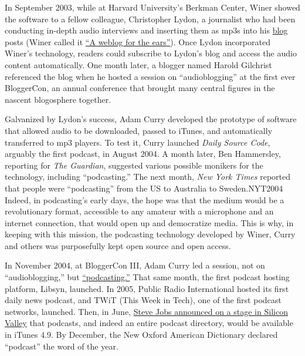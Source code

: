 \documentclass[notoc, symmetric, nobib, nols]{towcenter-guideto-book}
\begin{document}
In September 2003, while at Harvard University’s Berkman Center, Winer showed the software to a fellow colleague, Christopher Lydon, a journalist who had been conducting in-depth audio interviews and inserting them as mp3s into his \href{http://blogs.harvard.edu/lydondev/}{blog} posts (Winer called it \href{http://scripting.com/davenet/2003/07/31/chrisLydonsWeblogForTheEar.html}{``A weblog for the ears''}\autocite{WINER2}). Once Lydon incorporated  Winer’s technology, readers could subscribe to Lydon’s blog and access the audio content automatically. One month later, a blogger named Harold Gilchrist referenced the blog when he hosted a session on ``audioblogging'' at the first ever BloggerCon, an annual conference that brought many central figures in the nascent blogosphere together.\autocite{Solutions}


Galvanized by Lydon’s success, Adam Curry developed the prototype of software that allowed audio to be downloaded, passed to iTunes, and automatically transferred to mp3 players. To test it, Curry launched \textit{Daily Source Code}, arguably the first podcast, in August 2004.\autocite{Web2} A month later, Ben Hammersley, reporting for \textit{The Guardian}, suggested various possible monikers for the technology, including ``podcasting.''\autocite{Solutions} The next month, \textit{New York Times} reported that people were ``podcasting'' from the US to Australia to Sweden.{NYT2004} Indeed, in podcasting’s early days, the hope was that the medium would be a revolutionary format, accessible to any amateur with a microphone and an internet connection, that would open up and democratize media. This is why, in keeping with this mission, the podcasting technology developed by Winer, Curry and others was purposefully kept open source and open access.\autocite{WINER}

In November 2004, at BloggerCon III, Adam Curry led a session, not on ``audioblogging,'' but \href{http://web.archive.org/web/20130729212422id_/http://itc.conversationsnetwork.org/shows/detail275.html}{``podcasting.''}\autocite{Solutions} That same month, the first podcast hosting platform, Libsyn, launched. In 2005, Public Radio International hosted its first daily news podcast, and TWiT (This Week in Tech), one of the first podcast networks, launched. Then, in June, \href{https://www.youtube.com/watch?v=K0KNLCbzZUw}{Steve Jobs announced on a stage in Silicon Valley} that podcasts, and indeed an entire podcast directory, would be available in iTunes 4.9.\autocite{JobsVideo} By December, the New Oxford American Dictionary declared ``podcast'' the word of the year.\autocite{PCHistoryWiki}
\end{document}

